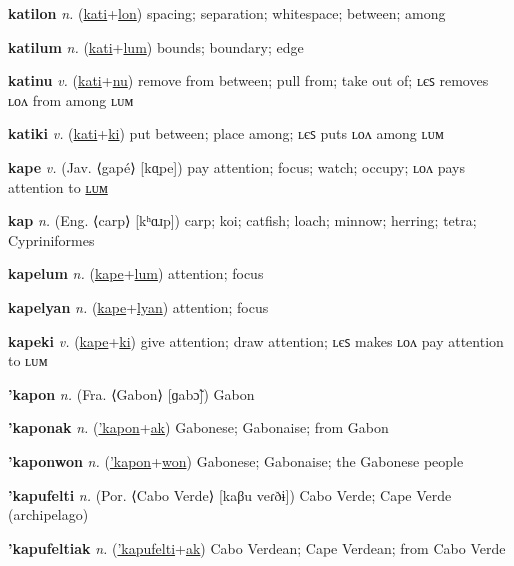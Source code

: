 \textbf{\hypertarget{katilon}{katilon}} \textit{n.} (\hyperlink{kati}{kati}+\allowbreak \hyperlink{lon}{lon})
spacing; separation; whitespace; between; among

\textbf{\hypertarget{katilum}{katilum}} \textit{n.} (\hyperlink{kati}{kati}+\allowbreak \hyperlink{lum}{lum})
bounds; boundary; edge

\textbf{\hypertarget{katinu}{katinu}} \textit{v.} (\hyperlink{kati}{kati}+\allowbreak \hyperlink{nu}{nu})
remove from between; pull from; take out of; ʟєꜱ removes ʟᴏᴧ from among ʟᴜᴍ

\textbf{\hypertarget{katiki}{katiki}} \textit{v.} (\hyperlink{kati}{kati}+\allowbreak \hyperlink{ki}{ki})
put between; place among; ʟєꜱ puts ʟᴏᴧ among ʟᴜᴍ

\textbf{\hypertarget{kape}{kape}} \textit{v.} (Jav. ⟨gapé⟩ [kɑ̤pe])
pay attention; focus; watch; occupy; ʟᴏᴧ pays attention to \hyperlink{kapelum}{ʟᴜᴍ}

\textbf{\hypertarget{kap}{kap}} \textit{n.} (Eng. ⟨carp⟩ [kʰɑɹp])
carp; koi; catfish; loach; minnow; herring; tetra; Cypriniformes

\textbf{\hypertarget{kapelum}{kapelum}} \textit{n.} (\hyperlink{kape}{kape}+\allowbreak \hyperlink{lum}{lum})
attention; focus

\textbf{\hypertarget{kapelyan}{kapelyan}} \textit{n.} (\hyperlink{kape}{kape}+\allowbreak \hyperlink{lyan}{lyan})
attention; focus

\textbf{\hypertarget{kapeki}{kapeki}} \textit{v.} (\hyperlink{kape}{kape}+\allowbreak \hyperlink{ki}{ki})
give attention; draw attention; ʟєꜱ makes ʟᴏᴧ pay attention to ʟᴜᴍ

\textbf{\hypertarget{'kapon}{'kapon}} \textit{n.} (Fra. ⟨Gabon⟩ [ɡabɔ̃])
Gabon

\textbf{\hypertarget{'kaponak}{'kaponak}} \textit{n.} (\hyperlink{'kapon}{'kapon}+\allowbreak \hyperlink{ak}{ak})
Gabonese; Gabonaise; from Gabon

\textbf{\hypertarget{'kaponwon}{'kaponwon}} \textit{n.} (\hyperlink{'kapon}{'kapon}+\allowbreak \hyperlink{won}{won})
Gabonese; Gabonaise; the Gabonese people

\textbf{\hypertarget{'kapufelti}{'kapufelti}} \textit{n.} (Por. ⟨Cabo Verde⟩ [kaβu veɾðɨ])
Cabo Verde; Cape Verde (archipelago)

\textbf{\hypertarget{'kapufeltiak}{'kapufeltiak}} \textit{n.} (\hyperlink{'kapufelti}{'kapufelti}+\allowbreak \hyperlink{ak}{ak})
Cabo Verdean; Cape Verdean; from Cabo Verde

